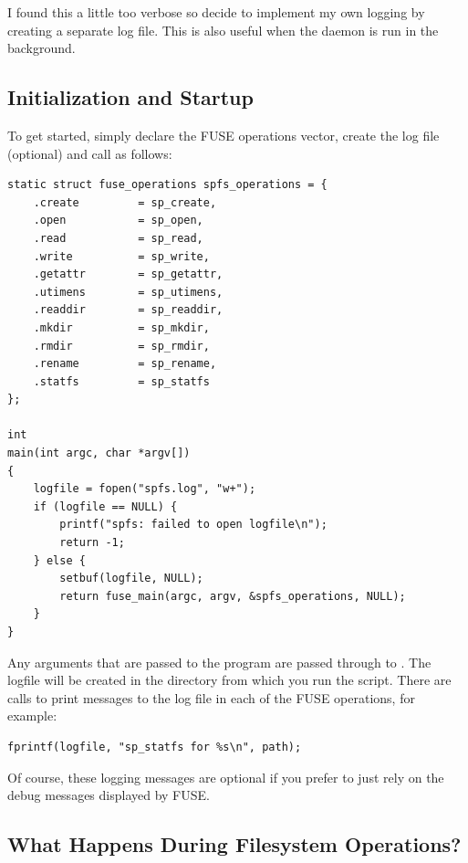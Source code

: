 \noindent
I found this a little too verbose so decide to implement my own logging by creating a separate log file. This is also useful when the daemon is run in the background.


\subsection{Initialization and Startup}

To get started, simply declare the FUSE operations vector, create the log file (optional) and call  as follows:

\begin{lstlisting}
static struct fuse_operations spfs_operations = {
    .create         = sp_create,
    .open           = sp_open,
    .read           = sp_read,
    .write          = sp_write,
    .getattr        = sp_getattr,
    .utimens        = sp_utimens,
    .readdir        = sp_readdir,
    .mkdir          = sp_mkdir,
    .rmdir          = sp_rmdir,
    .rename         = sp_rename,
    .statfs         = sp_statfs
};

int
main(int argc, char *argv[])
{
    logfile = fopen("spfs.log", "w+");
    if (logfile == NULL) {
        printf("spfs: failed to open logfile\n");
        return -1;
    } else {
        setbuf(logfile, NULL);
        return fuse_main(argc, argv, &spfs_operations, NULL);
    }
}
\end{lstlisting}

\noindent
Any arguments that are passed to the program are passed through to . The logfile will be created in the directory from which you run the script. There are calls to print messages to the log file in each of the FUSE operations, for example:

\begin{lstlisting}
fprintf(logfile, "sp_statfs for %s\n", path);
\end{lstlisting}

\noindent
Of course, these logging messages are optional if you prefer to just rely on the debug messages displayed by FUSE.


\subsection{What Happens During Filesystem Operations?}

